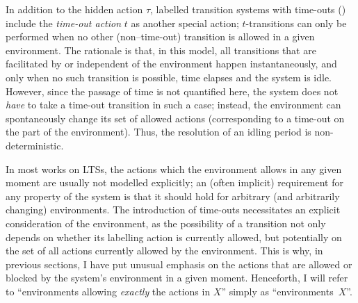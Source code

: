 %
\begin{isabellebody}%
%
%
\isadelimtheory
%
\endisadelimtheory
%
\isatagtheory
%
\endisatagtheory
{\isafoldtheory}%
%
\isadelimtheory
%
\endisadelimtheory
%
\isadelimdocument
%
\endisadelimdocument
%
\isatagdocument
%
\isamarkuptrue%
%
\endisatagdocument
{\isafolddocument}%
%
\isadelimdocument
%
\endisadelimdocument
%
\begin{isamarkuptext}%
\label{sec:LTSt}%
\end{isamarkuptext}\isamarkuptrue%
%
\begin{isamarkuptext}%
In addition to the hidden action $\tau$, labelled transition systems with time-outs (\LTSt{}) \cite{vanglabbeek2021failure} include the \emph{time-out action} $t$ as another special action; $t$-transitions can only be performed when no other (non--time-out) transition is allowed in a given environment. The rationale is that, in this model, all transitions that are facilitated by or independent of the environment happen instantaneously, and only when no such transition is possible, time elapses and the system is idle.
However, since the passage of time is not quantified here, the system does not \emph{have} to take a time-out transition in such a case; instead, the environment can spontaneously change its set of allowed actions (corresponding to a time-out on the part of the environment). Thus, the resolution of an idling period is non-deterministic.

In most works on LTSs, the actions which the environment allows in any given moment are usually not modelled explicitly; an (often implicit) requirement for any property of the system is that it should hold for arbitrary (and arbitrarily changing) environments. The introduction of time-outs necessitates an explicit consideration of the environment, as the possibility of a transition not only depends on whether its labelling action is currently allowed, but potentially on the set of all actions currently allowed by the environment. This is why, in previous sections, I have put unusual emphasis on the actions that are allowed or blocked by the system's environment in a given moment. Henceforth, I will refer to \enquote{environments allowing \emph{exactly} the actions in $X$} simply as \enquote{environments~$X$}.
\pagebreak
{}
\end{isamarkuptext}
\end{isabellebody}
